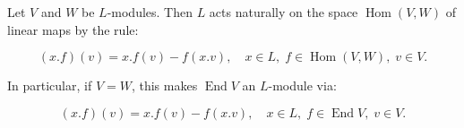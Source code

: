 Let $V$ and $W$ be $L$-modules. Then $L$ acts naturally on the space $\operatorname{Hom}(V, W)$ of linear maps by the rule:

$$(x.f)(v) = x.f(v) - f(x.v), \quad x \in L, \; f \in \operatorname{Hom}(V, W), \; v \in V.$$

In particular, if $V = W$, this makes $\operatorname{End} V$ an $L$-module via:

$$(x.f)(v) = x.f(v) - f(x.v), \quad x \in L, \; f \in \operatorname{End} V, \; v \in V.$$
